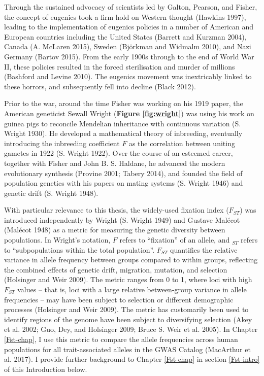 \documentclass[
]{book}
\begin{document}
Through the sustained advocacy of scientists led by Galton, Pearson, and Fisher, the concept of eugenics took a firm hold on Western thought (Hawkins 1997), leading to the implementation of eugenics policies in a number of American and European countries including the United States (Barrett and Kurzman 2004), Canada (A. McLaren 2015), Sweden (Björkman and Widmalm 2010), and Nazi Germany (Bartov 2015). From the early 1900s through to the end of World War II, these policies resulted in the forced sterilisation and murder of millions (Bashford and Levine 2010). The eugenics movement was inextricably linked to these horrors, and subsequently fell into decline (Black 2012).

Prior to the war, around the time Fisher was working on his 1919 paper, the American geneticist Sewall Wright (\textbf{Figure \ref{fig:wright}}) was using his work on guinea pigs to reconcile Mendelian inheritance with continuous variation (S. Wright 1930). He developed a mathematical theory of inbreeding, eventually introducing the inbreeding coefficient \(F\) as the correlation between uniting gametes in 1922 (S. Wright 1922). Over the course of an esteemed career, together with Fisher and John B. S. Haldane, he advanced the modern evolutionary synthesis (Provine 2001; Tabery 2014), and founded the field of population genetics with his papers on mating systems (S. Wright 1946) and genetic drift (S. Wright 1948).

With particular relevance to this thesis, the widely-used fixation index (\(F_{ST}\)) was introduced independently by Wright (S. Wright 1949) and Gustave Malécot (Malécot 1948) as a metric for measuring the genetic diversity between populations. In Wright's notation, \(F\) refers to ``fixation'' of an allele, and \(_{ST}\) refers to ``subpopulations within the total population''. \(F_{ST}\) quantifies the relative variance in allele frequency between groups compared to within groups, reflecting the combined effects of genetic drift, migration, mutation, and selection (Holsinger and Weir 2009). The metric ranges from 0 to 1, where loci with high \(F_{ST}\) values -- that is, loci with a large relative between-group variance in allele frequencies -- may have been subject to selection or different demographic processes (Holsinger and Weir 2009). The metric has customarily been used to identify regions of the genome have been subject to diversifying selection (Akey et al. 2002; Guo, Dey, and Holsinger 2009; Bruce S. Weir et al. 2005). In Chapter \ref{Fst-chap}, I use this metric to compare the allele frequencies across human populations for all trait-associated alleles in the GWAS Catalog (MacArthur et al. 2017). I provide further background to Chapter \ref{Fst-chap} in section \ref{Fst-intro} of this Introduction below.
\end{document}
